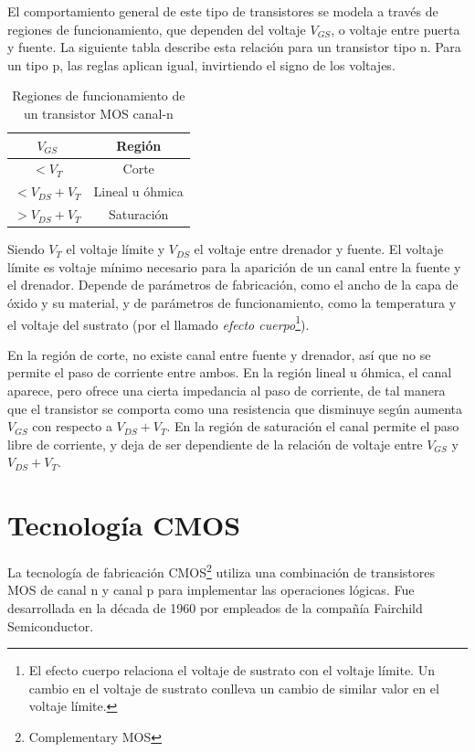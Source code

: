 \documentclass[12pt]{report} %
\begin{document}
	El comportamiento general de este tipo de transistores se modela a través de regiones de funcionamiento, que dependen del voltaje $V_{GS}$, o voltaje entre puerta y fuente.
	La siguiente tabla describe esta relación para un transistor tipo n. Para un tipo p, las reglas aplican igual, invirtiendo el signo de los voltajes.
	
	\begin{table}[H]\caption{Regiones de funcionamiento de un transistor MOS canal-n}\label{tb:n-channel-regions}
		\begin{tabular}{|c|c|}
			\hline
			$V_{GS}$ & Región \\
			\hline
			$< V_{T}$ & Corte \\
			\hline
			$< V_{DS} + V_{T}$ & Lineal u óhmica \\
			\hline
			$> V_{DS} + V_{T}$ & Saturación \\
			\hline
		\end{tabular}
	\end{table}

	Siendo $V_{T}$ el voltaje límite y $V_{DS}$ el voltaje entre drenador y fuente. El voltaje límite es voltaje mínimo necesario para la aparición de un canal entre la fuente y el drenador. Depende de parámetros de fabricación, como el ancho de la capa de óxido y su material, y de parámetros de funcionamiento, como la temperatura y el voltaje del sustrato (por el llamado \textit{efecto cuerpo}\footnote{El efecto cuerpo relaciona el voltaje de sustrato con el voltaje límite. Un cambio en el voltaje de sustrato conlleva un cambio de similar valor en el voltaje límite.}).
	
	En la región de corte, no existe canal entre fuente y drenador, así que no se permite el paso de corriente entre ambos. En la región lineal u óhmica, el canal aparece, pero ofrece una cierta impedancia al paso de corriente, de tal manera que el transistor se comporta como una resistencia que disminuye según aumenta $V_{GS}$ con respecto a $V_{DS} + V_{T}$. En la región de saturación el canal permite el paso libre de corriente, y deja de ser dependiente de la relación de voltaje entre $V_{GS}$ y $V_{DS} + V_{T}$.
	
	\section{Tecnología CMOS}
	
	La tecnología de fabricación CMOS\footnote{Complementary MOS} utiliza una combinación de transistores MOS de canal n y canal p para implementar las operaciones lógicas. Fue desarrollada en la década de 1960 por empleados de la compañía Fairchild Semiconductor\cite{cmos-fairchild}.
	
\end{document}
